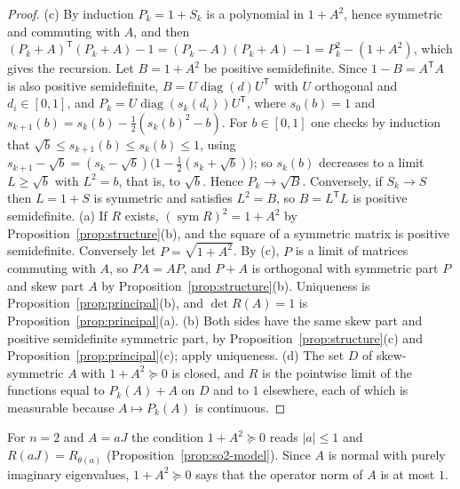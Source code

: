 \documentclass[11pt]{amsart}
\theoremstyle{definition}
\theoremstyle{remark}
\newcommand{\sym}{\operatorname{sym}}
\newcommand{\transp}{^{\mathsf T}}
\begin{document}
\begin{proof}
(c) By induction $P_k=1+S_k$ is a polynomial in $1+A^2$, hence symmetric and commuting with $A$,
and then $(P_k+A)\transp(P_k+A)-1=(P_k-A)(P_k+A)-1=P_k^2-(1+A^2)$, which gives the recursion.
Let $B=1+A^2$ be positive semidefinite.  Since $1-B=A\transp A$ is also positive semidefinite,
$B=U\operatorname{diag}(d)U\transp$ with $U$ orthogonal and $d_i\in[0,1]$, and
$P_k=U\operatorname{diag}(s_k(d_i))U\transp$, where $s_0(b)=1$ and
$s_{k+1}(b)=s_k(b)-\tfrac12(s_k(b)^2-b)$.  For $b\in[0,1]$ one checks by induction that
$\sqrt b\le s_{k+1}(b)\le s_k(b)\le1$, using
$s_{k+1}-\sqrt b=(s_k-\sqrt b)\bigl(1-\tfrac12(s_k+\sqrt b)\bigr)$; so $s_k(b)$ decreases to a limit
$L\ge\sqrt b$ with $L^2=b$, that is, to $\sqrt b$.  Hence $P_k\to\sqrt B$.  Conversely, if
$S_k\to S$ then $L=1+S$ is symmetric and satisfies $L^2=B$, so $B=L\transp L$ is positive
semidefinite.
(a) If $R$ exists, $(\sym R)^2=1+A^2$ by Proposition~\ref{prop:structure}(b), and the square of
a symmetric matrix is positive semidefinite.  Conversely let $P=\sqrt{1+A^2}$.  By (c), $P$ is a
limit of matrices commuting with $A$, so $PA=AP$, and $P+A$ is orthogonal with symmetric part
$P$ and skew part $A$ by Proposition~\ref{prop:structure}(b).  Uniqueness is
Proposition~\ref{prop:principal}(b), and $\det R(A)=1$ is Proposition~\ref{prop:principal}(a).
(b) Both sides have the same skew part and positive semidefinite symmetric part, by
Proposition~\ref{prop:structure}(c) and Proposition~\ref{prop:principal}(c); apply uniqueness.
(d) The set $D$ of skew-symmetric $A$ with $1+A^2\succeq0$ is closed, and $R$ is the pointwise
limit of the functions equal to $P_k(A)+A$ on $D$ and to $1$ elsewhere, each of which is
measurable because $A\mapsto P_k(A)$ is continuous.
\end{proof}

For $n=2$ and $A=aJ$ the condition $1+A^2\succeq0$ reads $|a|\le1$ and
$R(aJ)=R_{\theta(a)}$ (Proposition~\ref{prop:so2-model}).  Since $A$ is normal with purely
imaginary eigenvalues, $1+A^2\succeq0$ says that the operator norm of $A$ is at most $1$.
\end{document}
